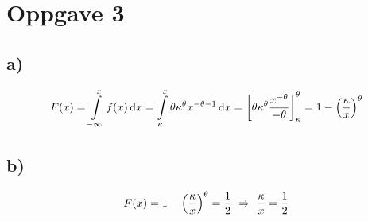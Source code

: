 \documentclass[12p,a4paper]{article}
\newcommand{\half}{\frac{1}{2}}
\begin{document}
\section*{Oppgave 3}
\subsection*{a)}
\begin{equation*}
    F(x) = \int\limits_{-\infty}^x f(x) \dd{x} = \int\limits_{\kappa}^x \theta\kappa^\theta x^{-\theta-1} \dd{x} = \qty[\theta\kappa^\theta\frac{x^{-\theta}}{-\theta}]_\kappa^\theta = 1 - \qty(\frac{\kappa}{x})^\theta
\end{equation*}


\subsection*{b)}
\begin{equation}
    F(x) = 1 - \qty(\frac{\kappa}{x})^\theta = \half \ \Rightarrow \ \frac{\kappa}{x} = \frac{1}{2}
\end{equation}
\end{document}
